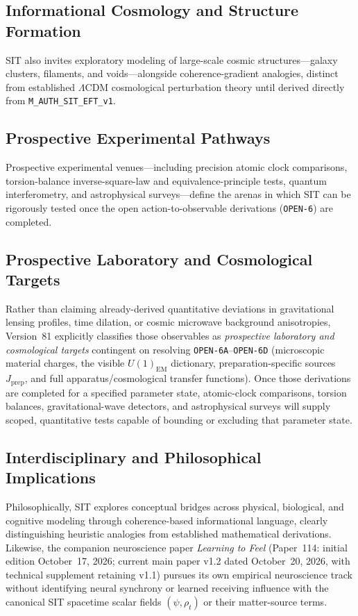 \subsection{Informational Cosmology and Structure Formation}

SIT also invites exploratory modeling of large-scale cosmic structures---galaxy clusters, filaments, and voids---alongside coherence-gradient analogies, distinct from established $\Lambda$CDM cosmological perturbation theory until derived directly from \texttt{M\_AUTH\_SIT\_EFT\_v1}.

\subsection{Prospective Experimental Pathways}

Prospective experimental venues---including precision atomic clock comparisons, torsion-balance inverse-square-law and equivalence-principle tests, quantum interferometry, and astrophysical surveys---define the arenas in which SIT can be rigorously tested once the open action-to-observable derivations (\texttt{OPEN-6}) are completed.

\subsection{Prospective Laboratory and Cosmological Targets}

Rather than claiming already-derived quantitative deviations in gravitational lensing profiles, time dilation, or cosmic microwave background anisotropies, Version~81 explicitly classifies those observables as \emph{prospective laboratory and cosmological targets} contingent on resolving \texttt{OPEN-6A}--\texttt{OPEN-6D} (microscopic material charges, the visible $U(1)_{\mathrm{EM}}$ dictionary, preparation-specific sources $J_{\mathrm{prep}}$, and full apparatus/cosmological transfer functions). Once those derivations are completed for a specified parameter state, atomic-clock comparisons, torsion balances, gravitational-wave detectors, and astrophysical surveys will supply scoped, quantitative tests capable of bounding or excluding that parameter state.

\subsection{Interdisciplinary and Philosophical Implications}

Philosophically, SIT explores conceptual bridges across physical, biological, and cognitive modeling through coherence-based informational language, clearly distinguishing heuristic analogies from established mathematical derivations. Likewise, the companion neuroscience paper \emph{Learning to Feel} (Paper~114: initial edition October~17, 2026; current main paper v1.2 dated October~20, 2026, with technical supplement retaining v1.1) pursues its own empirical neuroscience track without identifying neural synchrony or learned receiving influence with the canonical SIT spacetime scalar fields $(\psi, \rho_t)$ or their matter-source terms.


